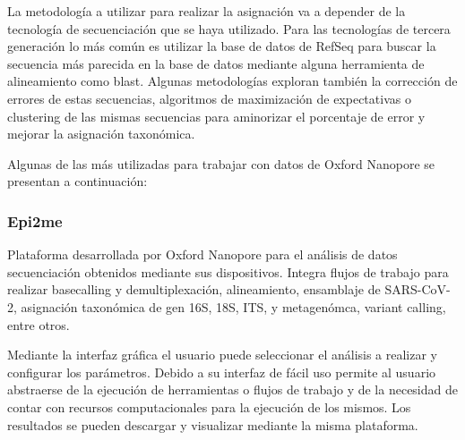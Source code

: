 La metodología a utilizar para realizar la asignación va a depender de la tecnología de secuenciación que se haya utilizado.%
Para las tecnologías de tercera generación lo más común es utilizar la base de datos de RefSeq para buscar la secuencia más parecida en la base de datos mediante alguna herramienta de alineamiento como blast.
Algunas metodologías exploran también la corrección de errores de estas secuencias, algoritmos de maximización de expectativas o clustering de las mismas secuencias para aminorizar el porcentaje de error y mejorar la asignación taxonómica. 

Algunas de las más utilizadas para trabajar con datos de Oxford Nanopore se presentan a continuación:

\subsubsection{Epi2me}
Plataforma desarrollada por Oxford Nanopore para el análisis de datos secuenciación obtenidos mediante sus dispositivos. 
Integra flujos de trabajo para realizar basecalling y demultiplexación, alineamiento, ensamblaje de SARS-CoV-2, asignación taxonómica de gen 16S, 18S, ITS, y metagenómca, variant calling, entre otros.

Mediante la interfaz gráfica el usuario puede seleccionar el análisis a realizar y configurar los parámetros. Debido a su interfaz de fácil uso permite al usuario abstraerse de la ejecución de herramientas o flujos de trabajo y de la necesidad de contar con recursos computacionales para la ejecución de los mismos.
Los resultados se pueden descargar y visualizar mediante la misma plataforma.


